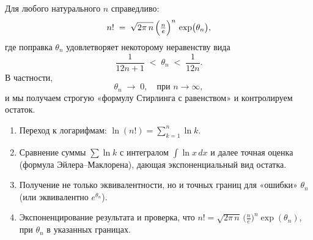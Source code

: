 
\begin{customtheorem}
	Для любого натурального $n$ справедливо:
	\[
		n!
		\;=\;
		\sqrt{2\pi\,n}
		\,\Bigl(\tfrac{n}{e}\Bigr)^n
		\,\exp\bigl(\theta_n\bigr),
	\]
	где поправка $\theta_n$ удовлетворяет некоторому неравенству вида
	\[
		\frac{1}{12n+1}
		\;<\;
		\theta_n
		\;<\;
		\frac{1}{12n}.
	\]
	В частности,
	\[
		\theta_n \;\to\;0,
		\quad \text{при }n\to\infty,
	\]
	и мы получаем строгую «формулу Стирлинга с равенством» и контролируем остаток.
\end{customtheorem}

\begin{proofplan}
	\begin{enumerate}
		\item Переход к логарифмам: $\ln(n!)= \sum_{k=1}^n\ln k$.
		\item Сравнение суммы $\sum \ln k$ с интегралом $\int \ln x\,dx$ и далее точная оценка
		      (формула Эйлера–Маклорена), дающая экспоненциальный вид остатка.
		\item Получение не только эквивалентности, но и точных границ для «ошибки»
		      $\theta_n$ (или эквивалентно $e^{\theta_n}$).
		\item Экспоненцирование результата и проверка, что
		      $n! = \sqrt{2\pi\,n}\,\bigl(\tfrac{n}{e}\bigr)^n \exp(\theta_n)$,
		      при $\theta_n$ в указанных границах.
	\end{enumerate}
\end{proofplan}

